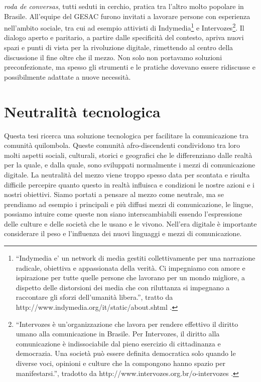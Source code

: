 \emph{roda de conversas}, tutti seduti in cerchio, pratica tra l'altro
molto popolare in Brasile. All'equipe del GESAC furono invitati a
lavorare persone con esperienza nell'ambito sociale, tra cui ad
esempio attivisti di Indymedia\footnote{``Indymedia e' un network di
  media gestiti collettivamente per una narrazione radicale, obiettiva
  e appassionata della verità. Ci impegniamo con amore e ispirazione
  per tutte quelle persone che lavorano per un mondo migliore, a
  dispetto delle distorsioni dei media che con riluttanza si impegnano
  a raccontare gli sforzi dell'umanità libera.'', tratto da
  http://www.indymedia.org/it/static/about.shtml .} e
Intervozes\footnote{``Intervozes è un'organizzazione che lavora per
  rendere effettivo il diritto umano alla comunicazione in Brasile.
  Per Intervozes, il diritto alla comunicazione è indissociabile dal
  pieno esercizio di cittadinanza e democrazia. Una società può essere
  definita democratica solo quando le diverse voci, opinioni e culture
  che la compongono hanno spazio per manifestarsi.'', tradotto da
  http://www.intervozes.org.br/o-intervozes .}. Il dialogo aperto e
paritario, a partire dalle specificità del contesto, apriva nuovi
spazi e punti di vista per la rivoluzione digitale, rimettendo al
centro della discussione il fine oltre che il mezzo. Non solo non
portavamo soluzioni preconfezionate, ma spesso gli strumenti e le
pratiche dovevano essere ridiscusse e possibilmente adattate a nuove
necessità.

\section{Neutralità tecnologica}
Questa tesi ricerca una soluzione tecnologica per facilitare la
comunicazione tra comunità quilombola. Queste comunità
afro-discendenti condividono tra loro molti aspetti sociali,
culturali, storici e geografici che le differenziano dalle realtà per
la quale, e dalla quale, sono sviluppati normalmente i mezzi di
comunicazione digitale. La neutralità del mezzo viene troppo spesso
data per scontata e risulta difficile percepire quanto questo in
realtà influisca e condizioni le nostre azioni e i nostri
obiettivi. Siamo portati a pensare al mezzo come neutrale, ma se
prendiamo ad esempio i principali e più diffusi mezzi di
comunicazione, le lingue, possiamo intuire come queste non siano
interscambiabili essendo l'espressione delle culture e delle società
che le usano e le vivono. Nell'era digitale è importante considerare
il peso e l'influenza dei nuovi linguaggi e mezzi di comunicazione.


